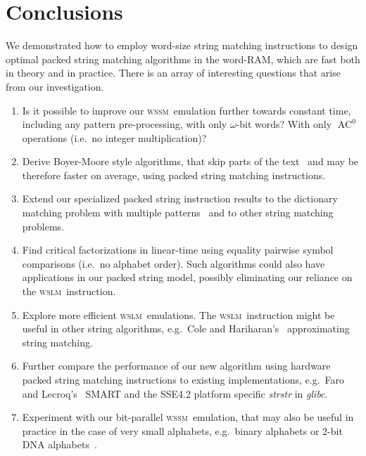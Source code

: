 \documentclass[12pt]{article}
\newcommand{\rem}[1]{{\marginpar{\raggedright\scriptsize #1}}}
\newcommand{\W}{{\omega}}
\newcommand{\wssm}{\textsc{wssm}}
\newcommand{\wslm}{\textsc{wslm}}
\begin{document}
\section{Conclusions}
\label{sec:conclusions}
We demonstrated how to employ word-size 
string matching
instructions to design optimal packed string matching algorithms 
in the word-RAM, which are fast both in theory and in practice.  There is
an array of interesting questions that arise from our investigation.
\begin{enumerate}
\item Is it possible to improve our \wssm\ emulation further towards constant time, 
including any pattern pre-processing,
with only $\W$-bit words? 
With only $\mathop{AC}^0$ operations (i.e.~no integer multiplication)?

\item Derive Boyer-Moore style algorithms,
that skip parts of the text~\cite{bm:77,commentz-walter:79,nr:98,yao:79}
and may be therefore faster on average,
using packed string matching instructions.

\item Extend our specialized packed string instruction results
to the dictionary matching problem
with multiple patterns~\cite{ac:75,belazzougui:10,commentz-walter:79,nr:98}
and to other string matching problems. 

\item Find critical factorizations in linear-time using 
equality pairwise symbol comparisons (i.e.~no alphabet order). 
Such algorithms could also have applications
in our packed string model, possibly eliminating our reliance on the
\wslm\ instruction.

\item Explore more efficient \wslm\ emulations.
The \wslm\ instruction might be useful in other string algorithms, 
e.g.~Cole and Hariharan's~\cite{ch:02} approximating string matching.

\item Further compare the performance of our new algorithm using hardware
packed string matching instructions to existing implementations,
e.g.~Faro and Lecroq's~\cite{FL2011} SMART and 
the SSE4.2 platform specific {\em strstr} in {\em glibc}. 

\item
Experiment with our bit-parallel \wssm\ emulation, 
that may also be useful in practice
in the case of very small alphabets,
e.g.~binary alphabets or 2-bit DNA alphabets~\cite{fl:2009,tp:1997}. 
\end{enumerate}
\end{document}
